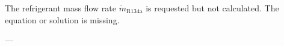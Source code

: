 The refrigerant mass flow rate \( \dot{m}_{\text{R134a}} \) is requested but not calculated. The equation or solution is missing.

---